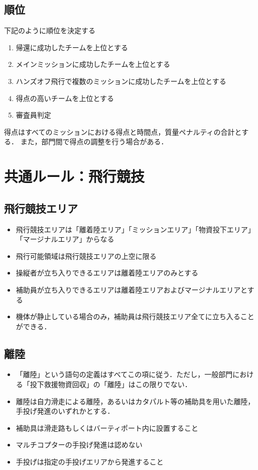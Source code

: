 \documentclass[a4paper,12pt,oneside]{jsarticle}
\begin{document}
\subsection{順位}
下記のように順位を決定する
\begin{enumerate}
  \item 帰還に成功したチームを上位とする
  \item メインミッションに成功したチームを上位とする
  \item ハンズオフ飛行で複数のミッションに成功したチームを上位とする
  \item 得点の高いチームを上位とする
  \item 審査員判定
\end{enumerate}
得点はすべてのミッションにおける得点と時間点，質量ペナルティの合計とする．
また，部門間で得点の調整を行う場合がある．

\section{共通ルール：飛行競技}
\subsection{飛行競技エリア}
\begin{itemize}
  \item 飛行競技エリアは「離着陸エリア」「ミッションエリア」「物資投下エリア」「マージナルエリア」からなる
  \item 飛行可能領域は飛行競技エリアの上空に限る
  \item 操縦者が立ち入りできるエリアは離着陸エリアのみとする
  \item 補助員が立ち入りできるエリアは離着陸エリアおよびマージナルエリアとする
  \item 機体が静止している場合のみ，補助員は飛行競技エリア全てに立ち入ることができる．
\end{itemize}

\subsection{離陸}
\begin{itemize}
  \item 「離陸」という語句の定義はすべてこの項に従う．ただし，一般部門における「投下救援物資回収」の「離陸」はこの限りでない．
  \item 離陸は自力滑走による離陸，あるいはカタパルト等の補助具を用いた離陸，手投げ発進のいずれかとする．
  \item 補助具は滑走路もしくはバーティポート内に設置すること
  \item マルチコプターの手投げ発進は認めない
  \item 手投げは指定の手投げエリアから発進すること
\end{itemize}
\end{document}
